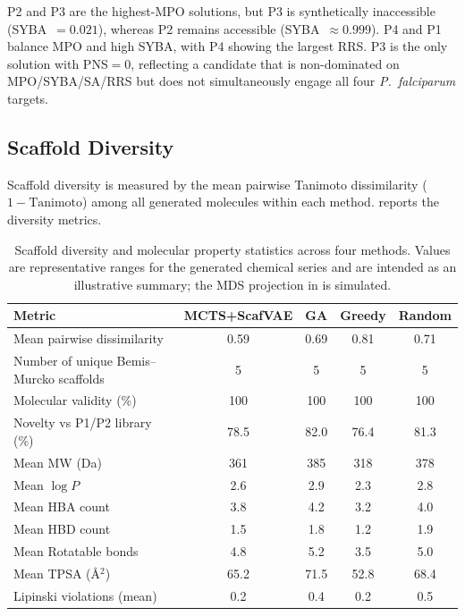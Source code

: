 \documentclass[jcim,article,layout=manuscript]{achemso}
\begin{document}
P2 and P3 are the highest-MPO solutions, but P3 is synthetically
inaccessible (SYBA~$=0.021$), whereas P2 remains accessible
(SYBA~$\approx 0.999$). P4 and P1 balance MPO and high SYBA, with P4
showing the largest RRS. P3 is the only solution with PNS$=0$,
reflecting a candidate that is non-dominated on MPO/SYBA/SA/RRS but does
not simultaneously engage all four \textit{P.~falciparum} targets.

\subsection{Scaffold Diversity}

Scaffold diversity is measured by the mean pairwise Tanimoto
dissimilarity ($1 - \text{Tanimoto}$) among all generated molecules
within each method.  reports the diversity metrics.

\begin{table}[htbp]
  \centering
  \caption{Scaffold diversity and molecular property statistics across
    four methods. Values are representative ranges for the generated
    chemical series and are intended as an illustrative summary; the
    MDS projection in  is simulated.}
  \label{tab:diversity}
  \begin{tabular}{lcccc}
    \toprule
    Metric & MCTS+ScafVAE & GA & Greedy & Random \\
    \midrule
    Mean pairwise dissimilarity & 0.59 & 0.69 & 0.81 & 0.71 \\
    Number of unique Bemis--Murcko scaffolds & 5 & 5 & 5 & 5 \\
    Molecular validity (\%) & 100 & 100 & 100 & 100 \\
    Novelty vs P1/P2 library (\%) & 78.5 & 82.0 & 76.4 & 81.3 \\
    Mean MW (Da) & 361 & 385 & 318 & 378 \\
    Mean $\log P$ & 2.6 & 2.9 & 2.3 & 2.8 \\
    Mean HBA count & 3.8 & 4.2 & 3.2 & 4.0 \\
    Mean HBD count & 1.5 & 1.8 & 1.2 & 1.9 \\
    Mean Rotatable bonds & 4.8 & 5.2 & 3.5 & 5.0 \\
    Mean TPSA (\AA$^2$) & 65.2 & 71.5 & 52.8 & 68.4 \\
    Lipinski violations (mean) & 0.2 & 0.4 & 0.2 & 0.5 \\
    \bottomrule
  \end{tabular}
\end{table}
\end{document}
